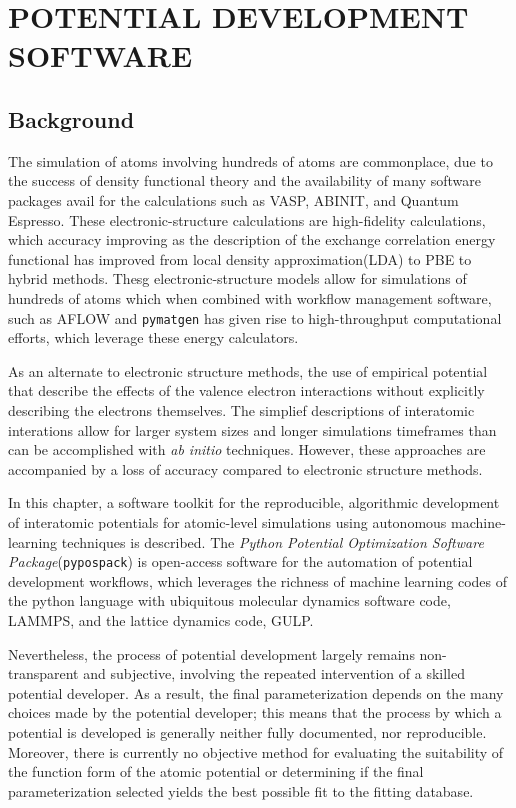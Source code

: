 \chapter{POTENTIAL DEVELOPMENT SOFTWARE}

\section{Background}
The simulation of atoms involving hundreds of atoms are commonplace, due to the success of density functional theory\cite{hohenberg1964_dft,kohn1965_dft} and the availability of many software packages avail for the calculations such as VASP\cite{kresse1993_vasp,kresse1996_vasp1,kresse1996_vasp2}, ABINIT\cite{gonze2002_abinit,gonze2005_abinit,gonze2009_abinit,gonze2016_abinit}, and Quantum Espresso\cite{giannozzi2009_quantumespresso}.  These electronic-structure calculations are high-fidelity calculations, which accuracy improving as the description of the exchange correlation energy functional has improved from local density approximation(LDA) to PBE to hybrid methods.  
Thesg electronic-structure models allow for simulations of hundreds of atoms which when combined with workflow management software, such as AFLOW\cite{curtarolo2012_aflow} and \verb|pymatgen|\cite{ong2013_pymatgen} has given rise to high-throughput computational efforts, which leverage these energy calculators.

As an alternate to electronic structure methods, the use of empirical potential that describe the effects of the valence electron interactions without explicitly describing the electrons themselves.  The simplief descriptions of interatomic interations allow for larger system sizes and longer simulations timeframes than can be accomplished with \emph{ab initio} techniques.  However, these approaches are accompanied by a loss of accuracy compared to electronic structure methods.

In this chapter, a software toolkit for the reproducible, algorithmic development of interatomic potentials for atomic-level simulations using autonomous machine-learning techniques is described.  
The \emph{Python Potential Optimization Software Package}(\verb|pypospack|) is open-access software for the automation of potential development workflows, which leverages the richness of machine learning codes of the python language with ubiquitous molecular dynamics software code, LAMMPS\cite{plimpton1995_lammps}, and the lattice dynamics code, GULP\cite{gale2003_gulp}.

Nevertheless, the process of potential development largely remains non-transparent and subjective, involving the repeated intervention of a skilled potential developer.\cite{martinez2013_fitting,martinez2016_posmat} 
As a result, the final parameterization depends on the many choices made by the potential developer; this means that the process by which a potential is developed is generally neither fully documented, nor reproducible. Moreover, there is currently no objective method for evaluating the suitability of the function form of the atomic potential or determining if the final parameterization selected yields the best possible fit to the fitting database.

